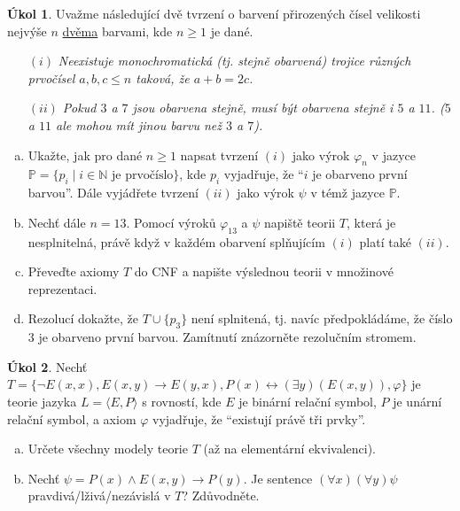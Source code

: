 \documentclass{amsart}
\theoremstyle{definition}
\newtheorem{task}{Úkol}
\begin{document}
\begin{task}
Uvažme následující dvě tvrzení o barvení přirozených čísel velikosti nejvýše $n$ \underline{dvěma} barvami, kde $n\ge 1$ je dané.
\begin{enumerate}
\item[$(i)$] {\it Neexistuje monochromatická (tj. stejně obarvená) trojice různých prvočísel  $a,b,c \le n$ taková, že $a+b=2c$.}
\item[$(ii)$] {\it Pokud $3$ a $7$ jsou obarvena stejně, musí být obarvena stejně i $5$ a $11$. ($5$ a $11$ ale mohou mít jinou barvu než $3$ a $7$).}
\end{enumerate}


\bigskip

\begin{enumerate}[(a)]
\item Ukažte, jak pro dané $n\ge 1$ napsat tvrzení $(i)$ jako výrok $\varphi_n$ v jazyce $\mathbb{P}=\{p_i \mid i\in \mathbb{N}\text{ je prvočíslo}\}$, kde $p_i$ vyjadřuje, že ``$i$ je obarveno první barvou''. Dále vyjádřete tvrzení $(ii)$ jako výrok $\psi$ v témž jazyce $\mathbb{P}$.
\item Nechť dále $n=13$. Pomocí výroků $\varphi_{13}$ a $\psi$ napiště teorii $T$, která je nesplnitelná, právě když v každém obarvení splňujícím $(i)$ platí také $(ii)$.
\item Převeďte axiomy $T$ do CNF a napište výslednou teorii v množinové reprezentaci.
\item Rezolucí dokažte, že $T \cup \{p_3\}$ není splnitená, tj. navíc předpokládáme, že číslo 3 je obarveno první barvou. Zamítnutí znázorněte rezolučním stromem.

\end{enumerate}
\end{task}

\bigskip

\begin{task}
Nechť $T = \{\neg E(x, x), E(x, y) \to E(y, x), P(x) \leftrightarrow (\exists y)( E(x,y)),\varphi\}$ je teorie jazyka $L =\langle E, P\rangle$ s rovností, kde $E$ je binární relační symbol, $P$ je unární relační symbol, a axiom $\varphi$ vyjadřuje, že ``existují právě tři prvky''.
\begin{enumerate}[(a)]
\item Určete všechny modely teorie $T$ (až na elementární ekvivalenci).
\item Nechť $\psi=P(x)\wedge E(x,y)\to P(y)$. Je sentence $(\forall x)(\forall y)\psi$ pravdivá/lživá/nezávislá v $T$? Zdůvodněte.
\end{enumerate}
\end{task}
\end{document}
